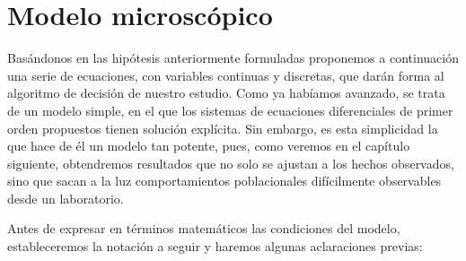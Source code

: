 \section{Modelo microscópico}
\label{sec:modelo}

Basándonos en las hipótesis anteriormente formuladas proponemos a continuación una serie de ecuaciones, con variables continuas y discretas, que darán forma al algoritmo de decisión de nuestro estudio. Como ya habíamos avanzado, se trata de un modelo simple, en el que los sistemas de ecuaciones diferenciales de primer orden propuestos tienen solución explícita. Sin embargo, es esta simplicidad la que hace de él un modelo tan potente, pues, como veremos en el capítulo siguiente, obtendremos resultados que no solo se ajustan a los hechos observados, sino que sacan a la luz comportamientos poblacionales difícilmente observables desde un laboratorio.

Antes de expresar en términos matemáticos las condiciones del modelo, estableceremos la notación a seguir y haremos algunas aclaraciones previas: 

